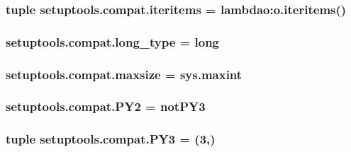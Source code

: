 \subsubsection[{iteritems}]{\setlength{\rightskip}{0pt plus 5cm}tuple setuptools.\+compat.\+iteritems = lambdao\+:o.\+iteritems()}\label{namespacesetuptools_1_1compat_a74b177248b3d24fd60022c543394af82}
\hypertarget{namespacesetuptools_1_1compat_ad933341305d2faff785bca7440f0afdc}{}
\subsubsection[{long\+\_\+type}]{\setlength{\rightskip}{0pt plus 5cm}setuptools.\+compat.\+long\+\_\+type = long}\label{namespacesetuptools_1_1compat_ad933341305d2faff785bca7440f0afdc}
\hypertarget{namespacesetuptools_1_1compat_a4ac23c230dbabba4294e386388312cf3}{}
\subsubsection[{maxsize}]{\setlength{\rightskip}{0pt plus 5cm}setuptools.\+compat.\+maxsize = sys.\+maxint}\label{namespacesetuptools_1_1compat_a4ac23c230dbabba4294e386388312cf3}
\hypertarget{namespacesetuptools_1_1compat_a2370a8b5d27d554ce9ff2f14408b30c2}{}
\subsubsection[{P\+Y2}]{\setlength{\rightskip}{0pt plus 5cm}setuptools.\+compat.\+P\+Y2 = not\+P\+Y3}\label{namespacesetuptools_1_1compat_a2370a8b5d27d554ce9ff2f14408b30c2}
\hypertarget{namespacesetuptools_1_1compat_a5bb177da155096a656dc94f715b01bce}{}
\subsubsection[{P\+Y3}]{\setlength{\rightskip}{0pt plus 5cm}tuple setuptools.\+compat.\+P\+Y3 = (3,)}\label{namespacesetuptools_1_1compat_a5bb177da155096a656dc94f715b01bce}
\hypertarget{namespacesetuptools_1_1compat_a02de19a1d6360e1e133acab1ad04e3f4}{}
